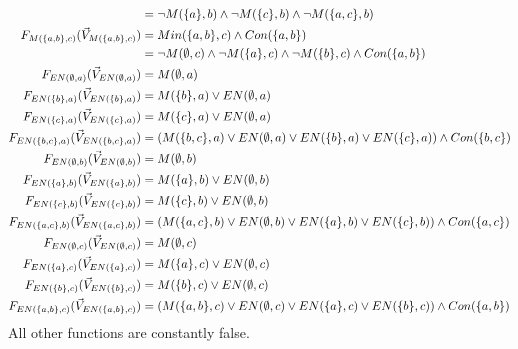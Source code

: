 \begin{example}
\begin{align*}
                          & = \neg M(\{a\},b) \wedge \neg M(\{c\},b)
        \wedge \neg M(\{a,c\},b)                                     \\
        F_{M(\{a,b\},c)}(\vec V_{M(\{a,b\},c)})  & = Min(\{a,b\},c) \wedge Con(\{a,b\})     \\
                          & = \neg M(\emptyset,c) \wedge \neg M(\{a\},c)
        \wedge \neg M(\{b\},c) \wedge Con(\{a,b\})                   \\
        F_{EN(\emptyset,a)}(\vec V_{EN(\emptyset,a)})      & = M(\emptyset,a)                                \\
        F_{EN(\{b\},a)}(\vec V_{EN(\{b\},a)})   & = M(\{b\},a) \vee EN(\emptyset,a)               \\
        F_{EN(\{c\},a)}(\vec V_{EN(\{c\},a)})   & = M(\{c\},a) \vee EN(\emptyset,a)               \\
        F_{EN(\{b,c\},a)}(\vec V_{EN(\{b,c\},a)}) & = (M(\{b,c\},a) \vee EN(\emptyset,a) \vee
        EN(\{b\},a) \vee EN(\{c\},a) ) \wedge Con(\{b,c\})           \\
        F_{EN(\emptyset,b)}(\vec V_{EN(\emptyset,b)})      & = M(\emptyset,b)                                \\
        F_{EN(\{a\},b)}(\vec V_{EN(\{a\},b)})   & = M(\{a\},b) \vee EN(\emptyset,b)               \\
        F_{EN(\{c\},b)}(\vec V_{EN(\{c\},b)})   & = M(\{c\},b) \vee EN(\emptyset,b)               \\
        F_{EN(\{a,c\},b)}(\vec V_{EN(\{a,c\},b)}) & = (M(\{a,c\},b) \vee EN(\emptyset,b) \vee
        EN(\{a\},b) \vee EN(\{c\},b) ) \wedge Con(\{a,c\})           \\
        F_{EN(\emptyset,c)}(\vec V_{EN(\emptyset,c)})      & = M(\emptyset,c)                                \\
        F_{EN(\{a\},c)}(\vec V_{EN(\{a\},c)})   & = M(\{a\},c) \vee EN(\emptyset,c)               \\
        F_{EN(\{b\},c)}(\vec V_{EN(\{b\},c)})   & = M(\{b\},c) \vee EN(\emptyset,c)               \\
        F_{EN(\{a,b\},c)}(\vec V_{EN(\{a,b\},c)}) & = (M(\{a,b\},c) \vee EN(\emptyset,c) \vee
        EN(\{a\},c) \vee EN(\{b\},c) ) \wedge Con(\{a,b\})           \\
    \end{align*}
    All other functions are constantly false.


\end{example}
